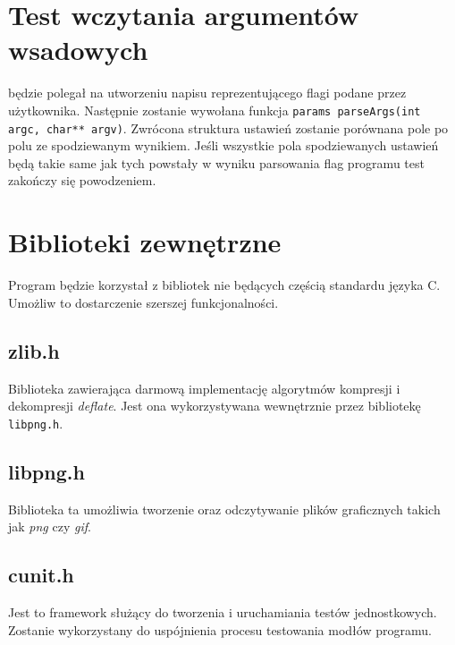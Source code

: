 \documentclass{article}
\begin{document}
\section{Test wczytania argumentów wsadowych} będzie polegał na utworzeniu napisu reprezentującego flagi podane przez użytkownika. Następnie zostanie wywołana funkcja \texttt{params parseArgs(int argc, char** argv)}. Zwrócona struktura ustawień zostanie porównana pole po polu ze spodziewanym wynikiem. Jeśli wszystkie pola spodziewanych ustawień będą takie same jak tych powstały w wyniku parsowania flag programu test zakończy się powodzeniem.

\section{Biblioteki zewnętrzne}
Program będzie korzystał z bibliotek nie będących częścią standardu języka C. Umożliw to dostarczenie szerszej funkcjonalności.

\subsection{zlib.h}
Biblioteka zawierająca darmową implementację algorytmów kompresji i dekompresji \textit{deflate}. Jest ona wykorzystywana wewnętrznie przez bibliotekę \texttt{libpng.h}.

\subsection{libpng.h}
Biblioteka ta umożliwia tworzenie oraz odczytywanie plików graficznych takich jak \textit{png} czy \textit{gif}.

\subsection{cunit.h}
Jest to framework służący do tworzenia i uruchamiania testów jednostkowych. Zostanie wykorzystany do uspójnienia procesu testowania modłów programu.
\end{document}
